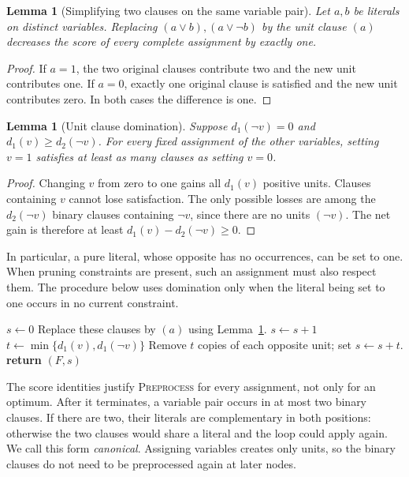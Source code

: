 \documentclass[11pt,a4paper]{article}
\newtheorem{lemma}[theorem]{Lemma}
\theoremstyle{definition}
\theoremstyle{remark}
\begin{document}
\begin{lemma}[Simplifying two clauses on the same variable pair]\label{lem:simplify}
Let $a,b$ be literals on distinct variables. Replacing
$(a\vee b),(a\vee\neg b)$ by the unit clause $(a)$ decreases the score of
every complete assignment by exactly one.
\end{lemma}
\begin{proof}
If $a=1$, the two original clauses contribute two and the new unit contributes
one. If $a=0$, exactly one original clause is satisfied and the new unit
contributes zero. In both cases the difference is one.
\end{proof}

\begin{lemma}[Unit clause domination]\label{lem:unit_dom}
Suppose $d_1(\neg v)=0$ and $d_1(v)\ge d_2(\neg v)$. For every fixed
assignment of the other variables, setting $v=1$ satisfies at least as many
clauses as setting $v=0$.
\end{lemma}
\begin{proof}
Changing $v$ from zero to one gains all $d_1(v)$ positive units. Clauses
containing $v$ cannot lose satisfaction. The only possible losses are among
the $d_2(\neg v)$ binary clauses containing $\neg v$, since there are no
units $(\neg v)$. The net gain is therefore at least
$d_1(v)-d_2(\neg v)\ge0$.
\end{proof}

In particular, a pure literal, whose opposite has no occurrences, can be
set to one. When pruning constraints are present, such an assignment must
also respect them. The procedure below uses domination only when the
literal being set to one occurs in no current constraint.

\begin{algorithm}[H]
\caption{\textnormal{\textsc{Preprocess}}$(F)$}\label{alg:preprocess}
\begin{algorithmic}[1]
\STATE $s\gets0$
  \STATE Replace these clauses by $(a)$ using Lemma~\ref{lem:simplify}.
  \STATE $s\gets s+1$
\ENDWHILE
{}
  \STATE $t\gets\min\{d_1(v),d_1(\neg v)\}$
  \STATE Remove $t$ copies of each opposite unit; set $s\gets s+t$.
\ENDFOR
\STATE \textbf{return} $(F,s)$
\end{algorithmic}
\end{algorithm}

The score identities justify \textnormal{\textsc{Preprocess}} for every assignment,
not only for an optimum. After it terminates, a variable pair occurs in
at most two binary clauses. If there are two, their literals are
complementary in both positions: otherwise the two clauses would share a
literal and the loop could apply again. We call this form \emph{canonical}.
Assigning variables creates only units, so the binary clauses do not need
to be preprocessed again at later nodes.
\end{document}

